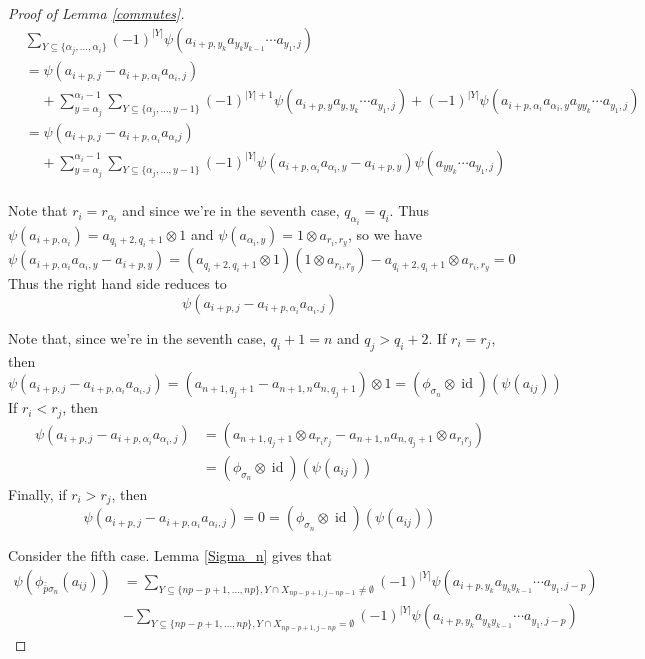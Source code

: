 \documentclass[11pt]{amsart}
\def\s{{\sigma}}
\def\a{\alpha}
\def\fp{{\scriptstyle \bar{\bar{p}}}}
\newcommand\id{\operatorname{id}}
\theoremstyle{definition}
\begin{document}
\begin{proof} [Proof of Lemma \ref{commutes}]
\begin{align*}
& \sum_{Y\subseteq \{\a_j,\ldots,\a_i\}}(-1)^{|Y|}\psi\left(a_{i+p,y_k}a_{y_ky_{k-1}}\cdots a_{y_1,j}\right)\\
&= \psi\left(a_{i+p,j} - a_{i+p,\a_i}a_{\a_i,j}\right)\\
& \;\;\;\;+ \sum_{y=\a_j}^{\a_i-1}\sum_{Y\subseteq \{\a_j,\ldots,y-1\}}(-1)^{|Y|+1}\psi\left(a_{i + p, y}a_{y,y_k}\cdots a_{y_1,j}\right) + (-1)^{|Y|}\psi\left(a_{i+p,\a_i}a_{\a_i,y}a_{yy_k}\cdots a_{y_1,j}\right)\\
&= \psi\left(a_{i+p,j} - a_{i+p,\a_i}a_{\a_ij}\right)\\
& \;\;\;\;+ \sum_{y=\a_j}^{\a_i-1}\sum_{Y\subseteq \{\a_j,\ldots,y-1\}}(-1)^{|Y|}\psi\left(a_{i+p,\a_i}a_{\a_i,y} - a_{i+p,y}\right)\psi\left(a_{yy_k}\cdots a_{y_1,j}\right)\\
\end{align*}



Note that $r_i = r_{\a_i}$ and since we're in the seventh case, $q_{\a_i}=q_i$.  Thus $\psi(a_{i+p,\a_i}) = a_{q_i+2,q_i+1}\otimes 1$ and $\psi(a_{\a_i,y}) = 1\otimes a_{r_i,r_y}$, so we have
$$\psi(a_{i+p,\a_i}a_{\a_i,y} - a_{i+p,y}) = \left(a_{q_i+2,q_i+1}\otimes  	1\right)\left(1\otimes a_{r_i,r_y}\right) - a_{q_i+2,q_i+1}\otimes a_{r_i,r_y} = 0$$
Thus the right hand side reduces to 
$$\psi\left(a_{i+p,j} - a_{i+p,\a_i}a_{\a_i,j}\right)$$

\noindent Note that, since we're in the seventh case, $q_i + 1 = n$ and $q_j > q_i + 2$.  If $r_i = r_j$, then 
$$\psi\left(a_{i+p,j} - a_{i+p,\a_i}a_{\a_i,j}\right) = \left(a_{n+1,q_j + 1} - a_{n+1,n}a_{n,q_j + 1}\right)\otimes 1 = (\phi_{\s_n} \otimes \id)(\psi(a_{ij}))$$
If $r_i < r_j$, then
\begin{align*}
\psi\left(a_{i+p,j} - a_{i+p,\a_i}a_{\a_i,j}\right) &= \left(a_{n+1,q_j + 1}\otimes a_{r_ir_j} - a_{n+1,n}a_{n,q_j + 1}\otimes a_{r_ir_j}\right)\\
&= (\phi_{\s_n} \otimes \id)(\psi(a_{ij}))
\end{align*}
Finally, if $r_i > r_j$, then
$$\psi\left(a_{i+p,j} - a_{i+p,\a_i}a_{\a_i,j}\right) = 0 = (\phi_{\s_n} \otimes \id)(\psi(a_{ij}))$$



\noindent Consider the fifth case.  Lemma \ref{Sigma_n} gives that
\begin{align*}
\psi\left(\phi_{\fp \s_n}(a_{ij})\right) &= \sum_{Y\subseteq \{np-p+1,\ldots,np\},Y\cap X_{np-p+1,j-np-1}\ne\emptyset}(-1)^{|Y|}\psi(a_{i+p,y_k}a_{y_ky_{k-1}}\cdots a_{y_1,j-p})\\
 &- \sum_{Y\subseteq \{np-p+1,\ldots,np\},Y\cap X_{np-p+1,j-np}=\emptyset}(-1)^{|Y|}\psi(a_{i+p,y_k}a_{y_ky_{k-1}}\cdots a_{y_1,j-p})
\end{align*}



\end{proof}
\end{document}
